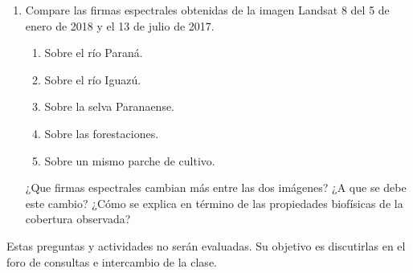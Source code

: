 \begin{enumerate}
  \item Compare las firmas espectrales obtenidas de la imagen Landsat 8 del 5 de enero de 2018 y el 13 de julio de 2017.
  \begin{enumerate}
    \item Sobre el río Paraná.
    \item Sobre el río Iguazú.
    \item Sobre la selva Paranaense.
    \item Sobre las forestaciones.
    \item Sobre un mismo parche de cultivo.
  \end{enumerate}
  ¿Que firmas espectrales cambian más entre las dos imágenes? ¿A que se debe este cambio? ¿Cómo se explica en término de las propiedades biofísicas de la cobertura observada?
\end{enumerate}

Estas preguntas y actividades no serán evaluadas. Su objetivo es discutirlas en el foro de consultas e intercambio de la clase.
